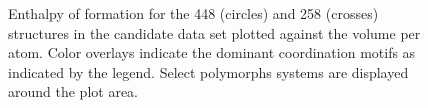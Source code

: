 \begin{figure}[!htb]
\centering
{}
\caption{\label{fig:E_vs_V}
%
Enthalpy of formation for the \num{448} \IrOtwo (circles) and \num{258} \IrOthree (crosses) structures in the candidate data set plotted against the volume per atom.
%
Color overlays indicate the dominant coordination motifs as indicated by the legend.
%
Select polymorphs systems are displayed around the plot area.
}
\end{figure}









